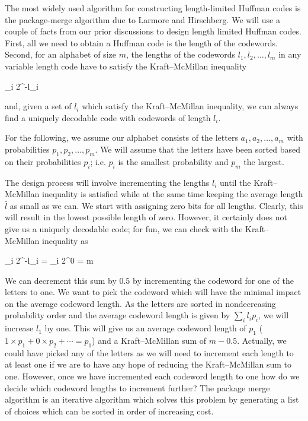 The most widely used algorithm for constructing length-limited Huffman codes is the package-merge algorithm due to Larmore and Hirschberg. We will use a couple of facts from our prior discussions to design length limited Huffman codes. First, all we need to obtain a Huffman code is the length of the codewords. Second, for an alphabet of size $m$, the lengths of the codewords $l_1 , l_2, \ldots, l_m$ in any variable length code have to satisfy the Kraft–McMillan inequality 

\bee
\sum_i 2^{-l_i} 
\eee

and, given a set of $l_i$ which satisfy the Kraft–McMillan inequality, we can always find a uniquely decodable code with codewords of length $l_i$.

For the following, we assume our alphabet consists of the letters $a_1, a_2, \ldots , a_m$ with probabilities $p_1, p_2, \ldots, p_m$. We will assume that the letters have been sorted based on their probabilities $p_i$; i.e. $p_i$ is the smallest probability and $p_m$ the largest.

The design process will involve incrementing the lengths $l_i$ until the Kraft–McMillan inequality is satisfied while at the same time keeping the average length $\bar{l}$ as small as we can. We start with assigning zero bits for all lengths. Clearly, this will result in the lowest possible length of zero. However, it certainly does not give us a uniquely decodable code; for fun, we can check with the Kraft–McMillan inequality as

\bee
\sum_i 2^{-l_i} = \sum_i 2^{0} = m 
\eee

We can decrement this sum by $0.5$ by incrementing the codeword for one of the letters to one. We want to pick the codeword which will have the minimal impact on the average codeword length. As the letters are sorted in nondecreasing probability order and the average codeword length is given by $\sum_i l_i p_i$, we will increase $l_1$ by one. This will give us an average codeword length of $p_1$ ($1 \times p_1 + 0 \times p_2 + \cdots = p_1$) and a Kraft–McMillan sum of $m - 0.5$. Actually, we could have picked any of the letters as we will need to increment each length to at least one if we are to have any hope of reducing the Kraft–McMillan sum to one. However, once we have incremented each codeword length to one how do we decide which codeword lengths to increment further? The package merge algorithm is an iterative algorithm which solves this problem by generating a list of choices which can be sorted in order of increasing cost.

